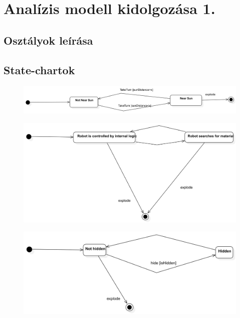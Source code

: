 \documentclass[../../projlab]{subfiles}
\begin{document}
\makeatletter


\makeatother

\chapter{Analízis modell kidolgozása 1.}


\section{Osztályok leírása}





\section{State-chartok}

\begin{figure}[H]
	\includegraphics[width=1\textwidth]{docs/2_Project/svg/Design Model!NearSun!NearSun_3.png}
	\centering
\end{figure}


\begin{figure}[H]
	\includegraphics[width=1\textwidth]{docs/2_Project/svg/Design Model!RobotActivities!RobotActivities_4.png}
	\centering
\end{figure}

\begin{figure}[H]
	\includegraphics[width=1\textwidth]{docs/2_Project/svg/Design Model!Spaceship Hide!Spaceship Hide_5.png}
	\centering
\end{figure}
\end{document}
